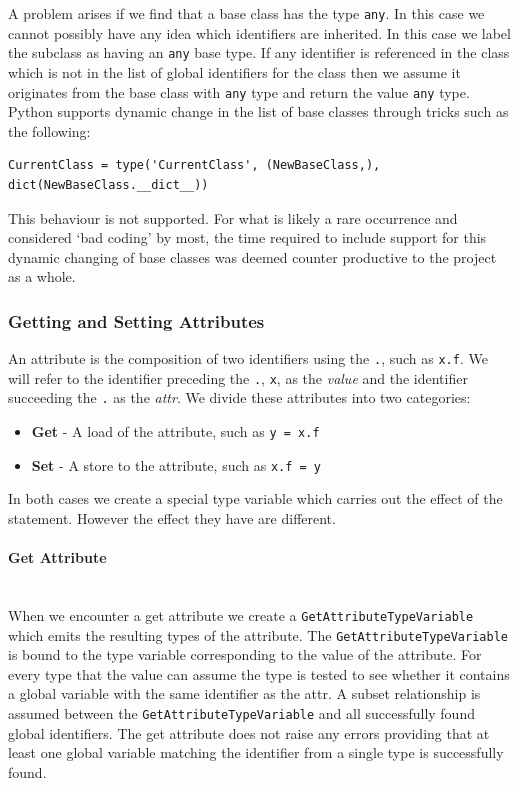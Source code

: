 \documentclass[12pt, titlepage]{article}
\begin{document}
A problem arises if we find that a base class has the type \texttt{any}. In this case we cannot possibly have any idea which identifiers are inherited. In this case we label the subclass as having an \texttt{any} base type. If any identifier is referenced in the class which is not in the list of global identifiers for the class then we assume it originates from the base class with \texttt{any} type and return the value \texttt{any} type. \\
\indent Python supports dynamic change in the list of base classes through tricks such as the following:
\begin{lstlisting}[mathescape]
CurrentClass = type('CurrentClass', (NewBaseClass,), dict(NewBaseClass.__dict__))
\end{lstlisting}
This behaviour is not supported. For what is likely a rare occurrence and considered `bad coding' by most, the time required to include support for this dynamic changing of base classes was deemed counter productive to the project as a whole.

\subsubsection{Getting and Setting Attributes}
An attribute is the composition of two identifiers using the \texttt{.}, such as \texttt{x.f}. We will refer to the identifier preceding the \texttt{.}, \texttt{x}, as the \textit{value} and the identifier succeeding the \texttt{.} as the \textit{attr}.  We divide these attributes into two categories:
\begin{itemize}
	\item \textbf{Get} - A load of the attribute, such as \texttt{y = x.f}
	\item \textbf{Set} - A store to the attribute, such as \texttt{x.f = y}
\end{itemize}
In both cases we create a special type variable which carries out the effect of the statement. However the effect they have are different.

\paragraph*{Get Attribute}\mbox{} \\
When we encounter a get attribute we create a \texttt{GetAttributeTypeVariable} which emits the resulting types of the attribute. The \texttt{GetAttributeTypeVariable} is bound to the type variable corresponding to the value of the attribute. For every type that the value can assume the type is tested to see whether it contains a global variable with the same identifier as the attr. A subset relationship is assumed between the \texttt{GetAttributeTypeVariable} and all successfully found global identifiers. The get attribute does not raise any errors providing that at least one global variable matching the identifier from a single type is successfully found.
\end{document}

